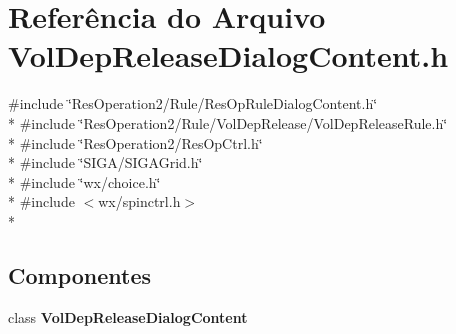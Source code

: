 \section{Referência do Arquivo Vol\+Dep\+Release\+Dialog\+Content.\+h}
\label{_2_rule_2_vol_dep_release_2_vol_dep_release_dialog_content_8h}
{\ttfamily \#include \char`\"{}Res\+Operation2/\+Rule/\+Res\+Op\+Rule\+Dialog\+Content.\+h\char`\"{}}\\*
{\ttfamily \#include \char`\"{}Res\+Operation2/\+Rule/\+Vol\+Dep\+Release/\+Vol\+Dep\+Release\+Rule.\+h\char`\"{}}\\*
{\ttfamily \#include \char`\"{}Res\+Operation2/\+Res\+Op\+Ctrl.\+h\char`\"{}}\\*
{\ttfamily \#include \char`\"{}S\+I\+G\+A/\+S\+I\+G\+A\+Grid.\+h\char`\"{}}\\*
{\ttfamily \#include \char`\"{}wx/choice.\+h\char`\"{}}\\*
{\ttfamily \#include $<$wx/spinctrl.\+h$>$}\\*
\subsection*{Componentes}
\begin{DoxyCompactItemize}
\item 
class {\bf Vol\+Dep\+Release\+Dialog\+Content}
\end{DoxyCompactItemize}
